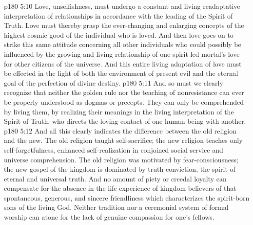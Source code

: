 \vs p180 5:10 Love, unselfishness, must undergo a constant and living readaptative interpretation of relationships in accordance with the leading of the Spirit of Truth. Love must thereby grasp the ever\hyp{}changing and enlarging concepts of the highest cosmic good of the individual who is loved. And then love goes on to strike this same attitude concerning all other individuals who could possibly be influenced by the growing and living relationship of one spirit\hyp{}led mortal’s love for other citizens of the universe. And this entire living adaptation of love must be effected in the light of both the environment of present evil and the eternal goal of the perfection of divine destiny.
\vs p180 5:11 And so must we clearly recognize that neither the golden rule nor the teaching of nonresistance can ever be properly understood as dogmas or precepts. They can only be comprehended by living them, by realizing their meanings in the living interpretation of the Spirit of Truth, who directs the loving contact of one human being with another.
\vs p180 5:12 And all this clearly indicates the difference between the old religion and the new. The old religion taught self\hyp{}sacrifice; the new religion teaches only self\hyp{}forgetfulness, enhanced self\hyp{}realization in conjoined social service and universe comprehension. The old religion was motivated by fear\hyp{}consciousness; the new gospel of the kingdom is dominated by truth\hyp{}conviction, the spirit of eternal and universal truth. And no amount of piety or creedal loyalty can compensate for the absence in the life experience of kingdom believers of that spontaneous, generous, and sincere friendliness which characterizes the spirit\hyp{}born sons of the living God. Neither tradition nor a ceremonial system of formal worship can atone for the lack of genuine compassion for one’s fellows.

